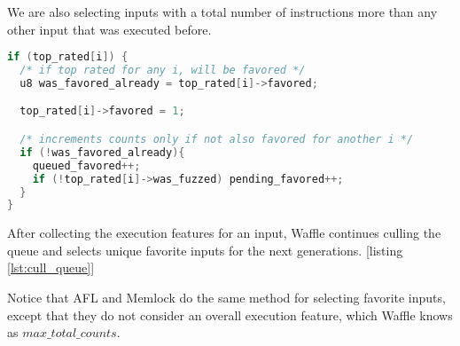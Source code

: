We are also selecting inputs with a total number of instructions more than any other input that was executed before.

\begin{lstlisting}[language=C++,style=CodeStyle,caption={Cull queue},label={lst:cull_queue}]
if (top_rated[i]) {
  /* if top rated for any i, will be favored */
  u8 was_favored_already = top_rated[i]->favored;

  top_rated[i]->favored = 1;

  /* increments counts only if not also favored for another i */
  if (!was_favored_already){
    queued_favored++;
    if (!top_rated[i]->was_fuzzed) pending_favored++;
  }
}

\end{lstlisting}

After collecting the execution features for an input, Waffle continues culling the queue and selects unique favorite inputs for the next generations. [listing \ref{lst:cull_queue}]

Notice that AFL and Memlock do the same method for selecting favorite inputs, except that they do not consider an overall execution feature, which Waffle knows as $max\_total\_counts$.